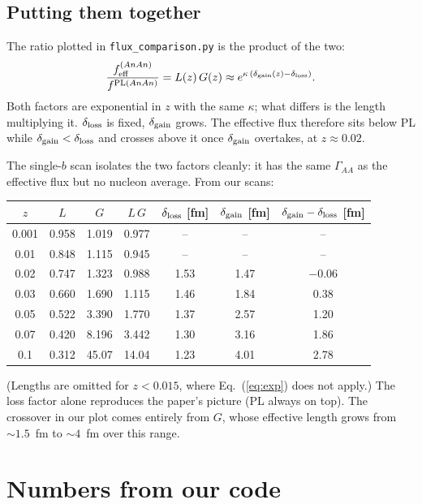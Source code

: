 \documentclass[11pt]{article}
\begin{document}
\subsection{Putting them together}

The ratio plotted in \texttt{flux\_comparison.py} is the product of the two:
\begin{equation}
  \frac{f^{(AnAn)}_{\rm eff}}{f^{{\rm PL}(AnAn)}} = L(z)\,G(z)
  \approx e^{\kappa\,(\delta_{\rm gain}(z)-\delta_{\rm loss})} .
\end{equation}
Both factors are exponential in $z$ with the same $\kappa$; what differs is
the length multiplying it. $\delta_{\rm loss}$ is fixed, $\delta_{\rm gain}$
grows. The effective flux therefore sits below PL while
$\delta_{\rm gain}<\delta_{\rm loss}$ and crosses above it once
$\delta_{\rm gain}$ overtakes, at $z\approx0.02$.

The single-$b$ scan isolates the two factors cleanly: it has the same
$\Gamma_{AA}$ as the effective flux but no nucleon average. From our scans:
\begin{center}
\begin{tabular}{ccccccc}
\toprule
$z$ & $L$ & $G$ & $L\,G$ & $\delta_{\rm loss}$ [fm] & $\delta_{\rm gain}$ [fm] & $\delta_{\rm gain}-\delta_{\rm loss}$ [fm] \\
\midrule
0.001 & 0.958 & 1.019 & 0.977 & -- & -- & -- \\
0.01  & 0.848 & 1.115 & 0.945 & -- & -- & -- \\
0.02  & 0.747 & 1.323 & 0.988 & 1.53 & 1.47 & $-0.06$ \\
0.03  & 0.660 & 1.690 & 1.115 & 1.46 & 1.84 & 0.38 \\
0.05  & 0.522 & 3.390 & 1.770 & 1.37 & 2.57 & 1.20 \\
0.07  & 0.420 & 8.196 & 3.442 & 1.30 & 3.16 & 1.86 \\
0.1   & 0.312 & 45.07 & 14.04 & 1.23 & 4.01 & 2.78 \\
\bottomrule
\end{tabular}
\end{center}
(Lengths are omitted for $z<0.015$, where Eq.~(\ref{eq:exp}) does not apply.)
The loss factor alone reproduces the paper's picture (PL always on top).
The crossover in our plot comes entirely from $G$, whose effective length
grows from $\sim1.5$~fm to $\sim4$~fm over this range.

\section{Numbers from our code}
\end{document}
